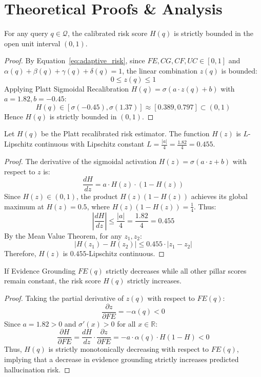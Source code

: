 \section{Theoretical Proofs \& Analysis}
\label{sec:proofs}

\begin{theorem}
For any query $q \in \mathcal{Q}$, the calibrated risk score $H(q)$ is strictly bounded in the open unit interval $(0, 1)$.
\end{theorem}
\begin{proof}
By Equation~\ref{eq:adaptive_risk}, since $FE, CG, CF, UC \in [0, 1]$ and $\alpha(q) + \beta(q) + \gamma(q) + \delta(q) = 1$, the linear combination $z(q)$ is bounded:
$$ 0 \le z(q) \le 1 $$
Applying Platt Sigmoidal Recalibration $H(q) = \sigma(a \cdot z(q) + b)$ with $a = 1.82, b = -0.45$:
$$ H(q) \in [\sigma(-0.45), \sigma(1.37)] \approx [0.389, 0.797] \subset (0, 1) $$
Hence $H(q)$ is strictly bounded in $(0, 1)$.
\end{proof}

\begin{theorem}
Let $H(q)$ be the Platt recalibrated risk estimator. The function $H(z)$ is $L$-Lipschitz continuous with Lipschitz constant $L = \frac{|a|}{4} = \frac{1.82}{4} = 0.455$.
\end{theorem}
\begin{proof}
The derivative of the sigmoidal activation $H(z) = \sigma(a \cdot z + b)$ with respect to $z$ is:
$$ \frac{dH}{dz} = a \cdot H(z) \cdot (1 - H(z)) $$
Since $H(z) \in (0, 1)$, the product $H(z)(1 - H(z))$ achieves its global maximum at $H(z) = 0.5$, where $H(z)(1 - H(z)) = \frac{1}{4}$. Thus:
$$ \left| \frac{dH}{dz} \right| \le \frac{|a|}{4} = \frac{1.82}{4} = 0.455 $$
By the Mean Value Theorem, for any $z_1, z_2$:
$$ |H(z_1) - H(z_2)| \le 0.455 \cdot |z_1 - z_2| $$
Therefore, $H(z)$ is $0.455$-Lipschitz continuous.
\end{proof}

\begin{proposition}
If Evidence Grounding $FE(q)$ strictly decreases while all other pillar scores remain constant, the risk score $H(q)$ strictly increases.
\end{proposition}
\begin{proof}
Taking the partial derivative of $z(q)$ with respect to $FE(q)$:
$$ \frac{\partial z}{\partial FE} = -\alpha(q) < 0 $$
Since $a = 1.82 > 0$ and $\sigma'(x) > 0$ for all $x \in \mathbb{R}$:
$$ \frac{\partial H}{\partial FE} = \frac{dH}{dz} \cdot \frac{\partial z}{\partial FE} = -a \cdot \alpha(q) \cdot H(1 - H) < 0 $$
Thus, $H(q)$ is strictly monotonically decreasing with respect to $FE(q)$, implying that a decrease in evidence grounding strictly increases predicted hallucination risk.
\end{proof}
